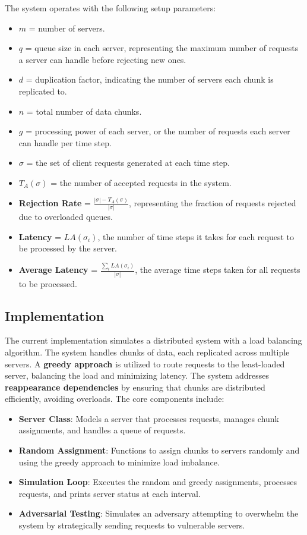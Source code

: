 \documentclass{article}
\begin{document}
The system operates with the following setup parameters:
\begin{itemize}
    \item \textbf{$m$} = number of servers.
    \item \textbf{$q$} = queue size in each server, representing the maximum number of requests a server can handle before rejecting new ones.
    \item \textbf{$d$} = duplication factor, indicating the number of servers each chunk is replicated to.
    \item \textbf{$n$} = total number of data chunks.
    \item \textbf{$g$} = processing power of each server, or the number of requests each server can handle per time step.
    \item \textbf{$\sigma$} = the set of client requests generated at each time step.
    \item \textbf{$T_A(\sigma)$} = the number of accepted requests in the system.
    \item \textbf{Rejection Rate} = \( \frac{|\sigma| - T_A(\sigma)}{|\sigma|} \), representing the fraction of requests rejected due to overloaded queues.
    \item \textbf{Latency} = \( LA(\sigma_i) \), the number of time steps it takes for each request to be processed by the server.
    \item \textbf{Average Latency} = \( \frac{\sum_{i} LA(\sigma_i)}{|\sigma|} \), the average time steps taken for all requests to be processed.
\end{itemize}

\subsection*{Implementation}

The current implementation simulates a distributed system with a load balancing algorithm. The system handles chunks of data, each replicated across multiple servers. A \textbf{greedy approach} is utilized to route requests to the least-loaded server, balancing the load and minimizing latency. The system addresses \textbf{reappearance dependencies} by ensuring that chunks are distributed efficiently, avoiding overloads. The core components include:
\begin{itemize}
    \item \textbf{Server Class}: Models a server that processes requests, manages chunk assignments, and handles a queue of requests.
    \item \textbf{Random Assignment}: Functions to assign chunks to servers randomly and using the greedy approach to minimize load imbalance.
    \item \textbf{Simulation Loop}: Executes the random and greedy assignments, processes requests, and prints server status at each interval.
    \item \textbf{Adversarial Testing}: Simulates an adversary attempting to overwhelm the system by strategically sending requests to vulnerable servers.
\end{itemize}
\end{document}
